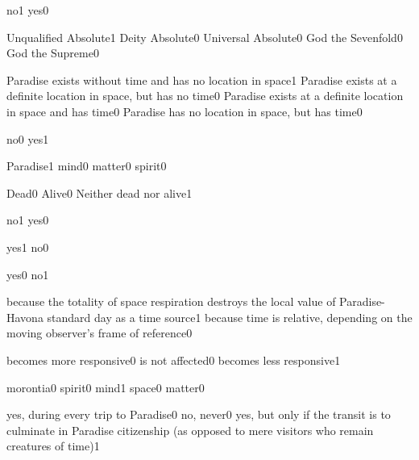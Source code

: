 {no}{1}
{yes}{0}
\qstop

{Unqualified Absolute}{1}
{Deity Absolute}{0}
{Universal Absolute}{0}
{God the Sevenfold}{0}
{God the Supreme}{0}
\qstop

{Paradise exists without time and has no location in space}{1}
{Paradise exists at a definite location in space, but has no time}{0}
{Paradise exists at a definite location in space and has time}{0}
{Paradise has no location in space, but has time}{0}
\qstop

{no}{0}
{yes}{1}
\qstop

{Paradise}{1}
{mind}{0}
{matter}{0}
{spirit}{0}
\qstop

{Dead}{0}
{Alive}{0}
{Neither dead nor alive}{1}
\qstop

{no}{1}
{yes}{0}
\qstop

{yes}{1}
{no}{0}
\qstop

{yes}{0}
{no}{1}
\qstop


{because the totality of space respiration destroys the local value of Paradise-Havona standard day as a time source}{1}
{because time is relative, depending on the moving observer's frame of reference}{0}
\qstop

{becomes more responsive}{0}
{is not affected}{0}
{becomes less responsive}{1}
\qstop

{morontia}{0}
{spirit}{0}
{mind}{1}
{space}{0}
{matter}{0}
\qstop

{yes, during every trip to Paradise}{0}
{no, never}{0}
{yes, but only if the transit is to culminate in Paradise citizenship (as opposed to mere visitors who remain creatures of time)}{1}
\qstop

